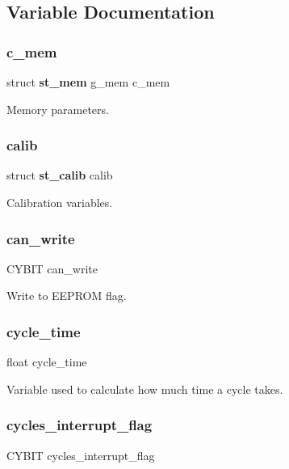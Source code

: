 \subsection{Variable Documentation}
\mbox{\label{globals_8h_a44c3cbd8e234e0816f0334e29646a800}} 
\subsubsection{c\+\_\+mem}
{\footnotesize\ttfamily struct \textbf{ st\+\_\+mem} g\+\_\+mem c\+\_\+mem}

Memory parameters. \mbox{\label{globals_8h_aed96fdd8308fe2c4fc07c3b5db1c7bbb}} 
\subsubsection{calib}
{\footnotesize\ttfamily struct \textbf{ st\+\_\+calib} calib}

Calibration variables. \mbox{\label{globals_8h_acd57396ca1b2a02a76877acecd29ddb0}} 
\subsubsection{can\+\_\+write}
{\footnotesize\ttfamily C\+Y\+B\+IT can\+\_\+write}

Write to E\+E\+P\+R\+OM flag. \mbox{\label{globals_8h_a910e6d34a0bb2e8dbaf576e06bdf56f5}} 
\subsubsection{cycle\+\_\+time}
{\footnotesize\ttfamily float cycle\+\_\+time}

Variable used to calculate how much time a cycle takes. \mbox{\label{globals_8h_a9c58c534e60c7991a92a13d012e7ef86}} 
\subsubsection{cycles\+\_\+interrupt\+\_\+flag}
{\footnotesize\ttfamily C\+Y\+B\+IT cycles\+\_\+interrupt\+\_\+flag}

